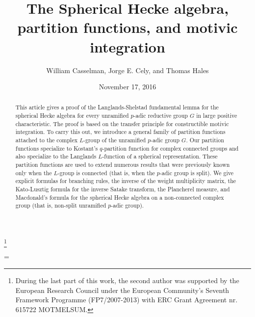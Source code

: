 \documentclass{amsart}
\theoremstyle{plain}
\theoremstyle{definition}
\theoremstyle{remark}
\numberwithin{equation}{subsection}
\begin{document}
\title
    {The Spherical Hecke algebra, partition functions, and motivic integration}
\author{William Casselman, Jorge E. Cely, and Thomas Hales}
\thanks{During the last part of this work, the second author was supported by the European Research Council under the European Community's Seventh Framework Programme (FP7/2007-2013) with ERC Grant Agreement nr. 615722 MOTMELSUM.}
\date{November 17, 2016}


\begin{abstract}   
This article gives a proof of the Langlands-Shelstad fundamental 
lemma for the spherical Hecke algebra
for every unramified $p$-adic reductive group $G$ in large positive 
characteristic.  The proof is based on the transfer principle
for constructible motivic integration.    To carry this out,
we introduce a general family of partition functions attached to 
the complex $L$-group of the unramified $p$-adic group $G$.
Our partition functions specialize to Kostant's $q$-partition 
function for complex connected groups and also 
specialize to the Langlands $L$-function of a spherical representation.
These partition functions are used to extend numerous 
results that were previously known only when the $L$-group is
connected (that is, when the $p$-adic group is split).
We give explicit formulas for branching rules, the inverse of the weight multiplicity matrix,
the Kato-Lusztig formula for the inverse Satake transform,
the Plancherel measure,  and Macdonald's formula for the spherical Hecke algebra on a
non-connected complex group (that is, non-split unramified $p$-adic group).  
\end{abstract}


\parskip=\baselineskip

 \maketitle



    

      
      
       
      
      
\end{document}
